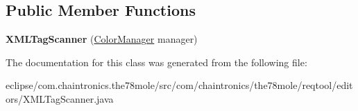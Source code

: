 \subsection*{Public Member Functions}
\begin{DoxyCompactItemize}
\item 
{\bfseries X\+M\+L\+Tag\+Scanner} (\hyperlink{classcom_1_1chaintronics_1_1the78mole_1_1reqtool_1_1editors_1_1ColorManager}{Color\+Manager} manager)\hypertarget{classcom_1_1chaintronics_1_1the78mole_1_1reqtool_1_1editors_1_1XMLTagScanner_ad3009ebeb0f6f92d536a0dcceb3d66a5}{}\label{classcom_1_1chaintronics_1_1the78mole_1_1reqtool_1_1editors_1_1XMLTagScanner_ad3009ebeb0f6f92d536a0dcceb3d66a5}

\end{DoxyCompactItemize}


The documentation for this class was generated from the following file\+:\begin{DoxyCompactItemize}
\item 
eclipse/com.\+chaintronics.\+the78mole/src/com/chaintronics/the78mole/reqtool/editors/X\+M\+L\+Tag\+Scanner.\+java\end{DoxyCompactItemize}

